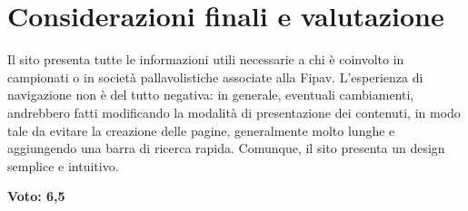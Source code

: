 \section{Considerazioni finali e valutazione}
	Il sito presenta tutte le informazioni utili necessarie a chi è coinvolto
	in campionati o in società pallavolistiche associate alla Fipav.
	L'esperienza di navigazione non è del tutto negativa: in generale, eventuali 
	cambiamenti, andrebbero fatti modificando la modalità di presentazione dei 
	contenuti, in modo tale da evitare la creazione delle pagine, generalmente molto 
	lunghe e aggiungendo una barra di ricerca rapida. Comunque, il sito presenta un
	design semplice e intuitivo.
	
	\begin{center}
	\textbf{Voto: 6,5}
	\end{center}